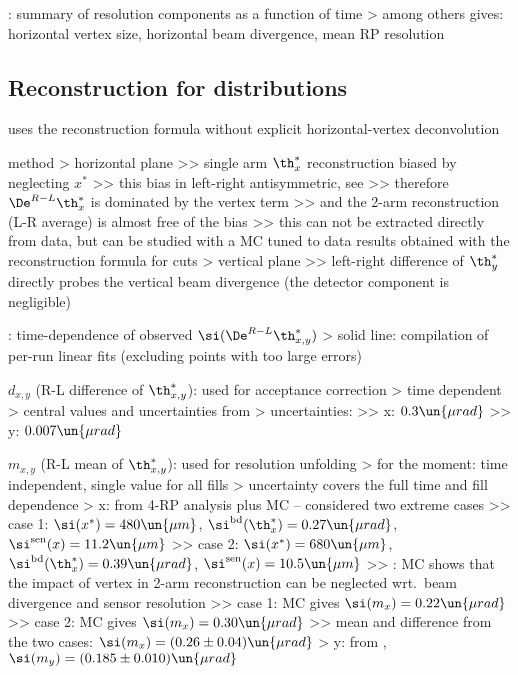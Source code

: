 \> : summary of resolution components as a function of time
\>> among others gives: horizontal vertex size, horizontal beam divergence, mean RP resolution

\subsection{Reconstruction for distributions}

\> uses the reconstruction formula without explicit horizontal-vertex deconvolution

\> method
\>> horizontal plane
\>>> single arm $\th_x^*$ reconstruction biased by neglecting $x^*$
\>>> this bias in left-right antisymmetric, see 
\>>> therefore $\De^{R-L} \th_x^*$ is dominated by the vertex term
\>>> and the 2-arm reconstruction (L-R average) is almost free of the bias
\>>> this can not be extracted directly from data, but can be studied with a MC tuned to data results obtained with the reconstruction formula for cuts
\>> vertical plane
\>>> left-right difference of $\th_y^*$ directly probes the vertical beam divergence (the detector component is negligible)

\>  : time-dependence of observed $\si(\De^{R-L} \th_{x, y}^*)$
\>> solid line: compilation of per-run linear fits (excluding points with too large errors)

\> $d_{x, y}$ (R-L difference of $\th_{x, y}^*$): used for acceptance correction
\>> time dependent
\>> central values and uncertainties from 
\>> uncertainties:
\>>> x: $0.3\un{\mu rad}$
\>>> y: $0.007\un{\mu rad}$

\> $m_{x, y}$ (R-L mean of $\th_{x, y}^*$): used for resolution unfolding
\>> for the moment: time independent, single value for all fills
\>> uncertainty covers the full time and fill dependence
\>> x: from 4-RP analysis plus MC -- considered two extreme cases
\>>> case 1: $\si(x^*) = 480\un{\mu m}$, $\si^{\rm bd}(\th^*_x) = 0.27\un{\mu rad}$, $\si^{\rm sen}(x) = 11.2\un{\mu m}$
\>>> case 2: $\si(x^*) = 680\un{\mu m}$, $\si^{\rm bd}(\th^*_x) = 0.39\un{\mu rad}$, $\si^{\rm sen}(x) = 10.5\un{\mu m}$
\>>> : MC shows that the impact of vertex in 2-arm reconstruction can be neglected wrt.~beam divergence and sensor resolution
\>>> case 1: MC gives $\si(m_x) = 0.22\un{\mu rad}$
\>>> case 2: MC gives $\si(m_x) = 0.30\un{\mu rad}$
\>>> mean and difference from the two cases: $\si(m_x) = (0.26 \pm 0.04)\un{\mu rad}$
\>> y: from , $\si(m_y) = (0.185 \pm 0.010)\un{\mu rad}$




